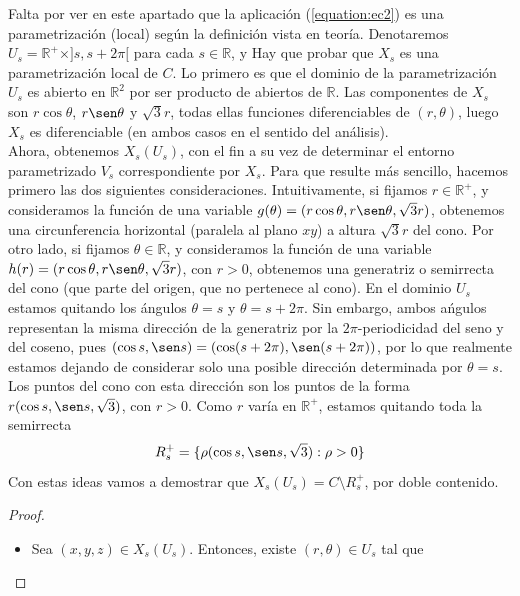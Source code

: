 \documentclass[12pt]{article}
\newcommand{\R}{\mathbb{R}}
\newcommand{\Rmas}{\R^{+}}
\begin{document}
\begin{ejercicio}
\begin{enumerate}
            Falta por ver en este apartado que la aplicación (\ref{equation:ec2}) es una parametrización (local) según la definición vista en teoría.
            Denotaremos $U_s = \Rmas\times ]s,s+2\pi[$ para cada $s \in \R$, y \Func{X_s}{U_s}{\R^3}{(r,\theta)}{X_s(r,\theta) = (r \cos \theta, r \sen \theta, \sqrt{3}r)}
            Hay que probar que $X_s$ es una parametrización local de $C$. Lo primero es que el dominio de la parametrización $U_s$ es abierto en $\R^2$ por 
            ser producto de abiertos de $\R$. Las componentes de $X_s$ son $r \cos \theta$, $r \sen \theta$ y $\sqrt{3}r$, todas ellas 
            funciones diferenciables de $(r, \theta)$, luego $X_s$ es diferenciable (en ambos casos en el sentido del análisis). \\

            Ahora, obtenemos $X_s(U_s)$, con el fin a su vez de determinar el entorno parametrizado $V_s$ correspondiente por $X_s$. Para que resulte más sencillo,
            hacemos primero las dos siguientes consideraciones. Intuitivamente, si fijamos $r \in \Rmas$, y consideramos la función de una variable 
            $g(\theta) = (r \cos \theta, r \sen \theta, \sqrt{3}r)$, obtenemos una circunferencia horizontal (paralela al plano $xy$) a altura $\sqrt{3}r$ 
            del cono. Por otro lado, si fijamos $\theta \in \R$, y consideramos la función de una variable $h(r) = (r \cos \theta, r \sen \theta, \sqrt{3}r)$, 
            con $r > 0$, obtenemos una generatriz o semirrecta del cono (que parte del origen, que no pertenece al cono). En el dominio $U_s$ estamos quitando 
            los ángulos $\theta = s$ y $\theta = s + 2 \pi$. Sin embargo, ambos ańgulos representan la misma dirección de la generatriz por la 
            $2\pi$-periodicidad del seno y del coseno, pues $(\cos s, \sen s) = (\cos (s + 2 \pi), \sen (s + 2\pi))$, por lo que realmente estamos dejando 
            de considerar solo una posible dirección determinada por $\theta = s$. Los puntos del cono con esta dirección son los puntos de la forma 
            $r(\cos s, \sen s, \sqrt{3})$, con $r>0$. Como $r$ varía en $\Rmas$, estamos quitando toda la semirrecta $$R^{+}_s = \{\rho(\cos s, \sen s, 
            \sqrt{3}) : \rho > 0\}$$
            Con estas ideas vamos a demostrar que $X_s(U_s) = C \setminus R_s^+$, por doble contenido.
            \begin{proof}~
                \begin{itemize}
                    \item[$\subseteq)$] Sea $(x,y,z) \in X_s(U_s)$. Entonces, existe $(r, \theta) \in U_s$ tal que 

\end{itemize}
\end{proof}
\end{enumerate}
\end{ejercicio}
\end{document}
